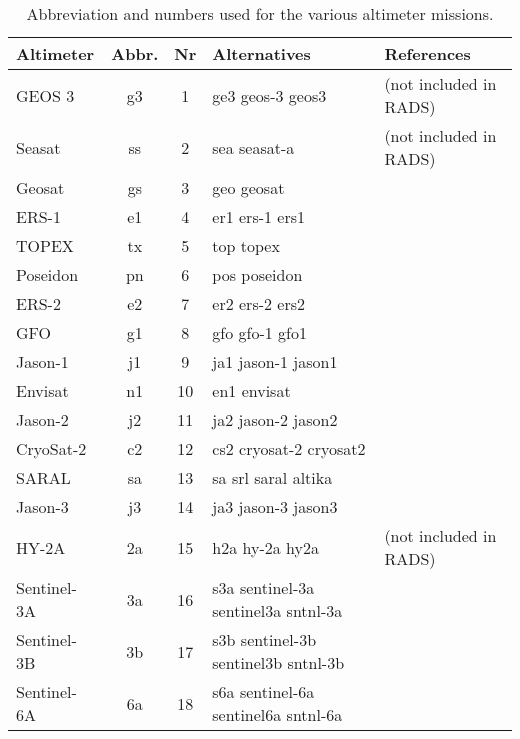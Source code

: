 \begin{table}
\begin{tabular}{lccll}
\hline
Altimeter & Abbr. & Nr & Alternatives & References \\
\hline
GEOS 3      & g3 &  1 & ge3 geos-3 geos3                    & (not included in RADS) \\
Seasat      & ss &  2 & sea seasat-a                        & (not included in RADS) \\
Geosat      & gs &  3 & geo geosat                          & \\
ERS-1       & e1 &  4 & er1 ers-1 ers1                      & \citep{francis1990a,francis1991a} \\
TOPEX       & tx &  5 & top topex                           & \citep{fu1994} \\
Poseidon    & pn &  6 & pos poseidon                        & \\
ERS-2       & e2 &  7 & er2 ers-2 ers2                      & \citep{francis1995a} \\
GFO         & g1 &  8 & gfo gfo-1 gfo1                      & \\
Jason-1     & j1 &  9 & ja1 jason-1 jason1                  & \citep{menard2003} \\
Envisat     & n1 & 10 & en1 envisat                         & \\
Jason-2     & j2 & 11 & ja2 jason-2 jason2                  & \citep{lambin2010} \\
CryoSat-2   & c2 & 12 & cs2 cryosat-2 cryosat2              & \citep{wingham2006} \\
SARAL       & sa & 13 & sa srl saral altika                 & \\
Jason-3     & j3 & 14 & ja3 jason-3 jason3                  & \\
HY-2A       & 2a & 15 & h2a hy-2a hy2a                      & (not included in RADS) \\
Sentinel-3A & 3a & 16 & s3a sentinel-3a sentinel3a sntnl-3a & \\
Sentinel-3B & 3b & 17 & s3b sentinel-3b sentinel3b sntnl-3b & \\
Sentinel-6A & 6a & 18 & s6a sentinel-6a sentinel6a sntnl-6a & \\
\hline
\end{tabular}
\caption{Abbreviation and numbers used for the various altimeter missions.}
\label{tab:rads4_sats}
\end{table}
